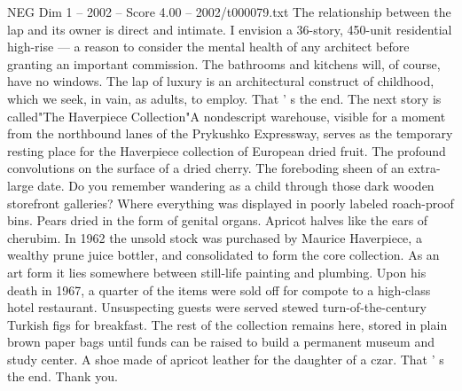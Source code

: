\begin{textsample}{NEG Dim 1 – 2002 – Score 4.00 – 2002/t000079.txt}
The relationship between the lap and its owner is direct and intimate.
I envision a 36-story, 450-unit residential high-rise — a reason to consider the mental health of any architect before granting an important commission.
The bathrooms and kitchens will, of course, have no windows.
The lap of luxury is an architectural construct of childhood, which we seek, in vain, as adults, to employ.
That ' s the end.
The next story is called"The Haverpiece Collection"A nondescript warehouse, visible for a moment from the northbound lanes of the Prykushko Expressway, serves as the temporary resting place for the Haverpiece collection of European dried fruit.
The profound convolutions on the surface of a dried cherry.
The foreboding sheen of an extra-large date.
Do you remember wandering as a child through those dark wooden storefront galleries?
Where everything was displayed in poorly labeled roach-proof bins.
Pears dried in the form of genital organs.
Apricot halves like the ears of cherubim.
In 1962 the unsold stock was purchased by Maurice Haverpiece, a wealthy prune juice bottler, and consolidated to form the core collection.
As an art form it lies somewhere between still-life painting and plumbing.
Upon his death in 1967, a quarter of the items were sold off for compote to a high-class hotel restaurant.
Unsuspecting guests were served stewed turn-of-the-century Turkish figs for breakfast.
The rest of the collection remains here, stored in plain brown paper bags until funds can be raised to build a permanent museum and study center.
A shoe made of apricot leather for the daughter of a czar.
That ' s the end.
Thank you.

\end{textsample}
